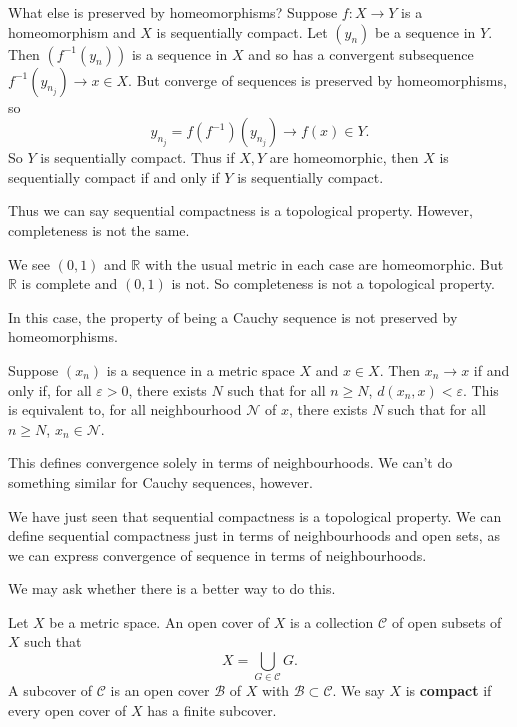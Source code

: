\documentclass[12pt]{article}
\begin{document}
What else is preserved by homeomorphisms? Suppose $f : X \to Y$ is a homeomorphism and $X$ is sequentially compact. Let $(y_n)$ be a sequence in $Y$. Then $(f^{-1}(y_n))$ is a sequence in $X$ and so has a convergent subsequence $f^{-1}(y_{n_j}) \to x \in X$. But converge of sequences is preserved by homeomorphisms, so
\[
	y_{n_j} = f(f^{-1})(y_{n_j}) \to f(x) \in Y
.\]
So $Y$ is sequentially compact. Thus if $X, Y$ are homeomorphic, then $X$ is sequentially compact if and only if $Y$ is sequentially compact.

Thus we can say sequential compactness is a topological property. However, completeness is not the same.

\begin{exbox}
	We see $(0, 1)$ and $\mathbb{R}$ with the usual metric in each case are homeomorphic. But $\mathbb{R}$ is complete and $(0, 1)$ is not. So completeness is not a topological property.
\end{exbox}

In this case, the property of being a Cauchy sequence is not preserved by homeomorphisms.

\begin{remark}
	Suppose $(x_n)$ is a sequence in a metric space $X$ and $x \in X$. Then $x_n \to x$ if and only if, for all $\varepsilon > 0$, there exists $N$ such that for all $n \geq N$, $d(x_n, x) < \varepsilon$. This is equivalent to, for all neighbourhood $\mathcal{N}$ of $x$, there exists $N$ such that for all $n \geq N$, $x_n \in \mathcal{N}$.

	This defines convergence solely in terms of neighbourhoods. We can't do something similar for Cauchy sequences, however.
\end{remark}

We have just seen that sequential compactness is a topological property. We can define sequential compactness just in terms of neighbourhoods and open sets, as we can express convergence of sequence in terms of neighbourhoods.

We may ask whether there is a better way to do this.

\begin{definition}
	Let $X$ be a metric space. An open cover of $X$ is a collection $\mathcal{C}$ of open subsets of $X$ such that
	\[
	X = \bigcup_{G \in \mathcal{C}}G
	.\]
	A subcover of $\mathcal{C}$ is an open cover $\mathcal{B}$ of $X$ with $\mathcal{B} \subset \mathcal{C}$. We say $X$ is \textbf{compact} if every open cover of $X$ has a finite subcover.
\end{definition}
\end{document}
